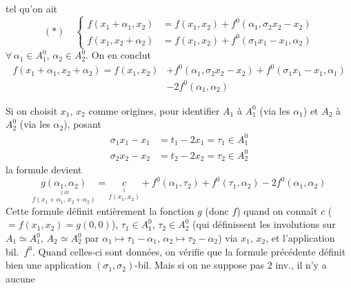 \documentclass[11pt,a4paper]{article}
\begin{document}
tel qu'on ait
\[
  (*) \quad
  \left\{
  \begin{aligned}
    f(x_1 + \alpha_1, x_2) &= f(x_1, x_2) + f^0(\alpha_1, \sigma_2 x_2 - x_2) \\
    f(x_1, x_2 + \alpha_2) &= f(x_1, x_2) + f^0(\sigma_1 x_1 - x_1, \alpha_2)
  \end{aligned}
  \right.
\]
$\forall\, \alpha_1 \in A_1^0$, $\alpha_2 \in A_2^0$. On en conclut
\[
  \begin{aligned}
    f(x_1 + \alpha_1, x_2 + \alpha_2) = f(x_1, x_2) &+ f^0(\alpha_1, \sigma_2 x_2 - x_2) + f^0(\sigma_1 x_1 - x_1, \alpha_1) \\
    &- 2 f^0(\alpha_1, \alpha_2)
  \end{aligned}
\]

Si on choisit $x_1$, $x_2$ comme origines, pour identifier $A_1$ à $A_1^0$ (via les $\alpha_1$) et $A_2$ à $A_2^0$ (via les $\alpha_2$), posant
\[
  \begin{aligned}
    \sigma_1 x_1 - x_1 &= t_1 - 2x_1 = \tau_1 \in A_1^0 \\
    \sigma_2 x_2 - x_2 &= t_2 - 2x_2 = \tau_2 \in A_2^0
  \end{aligned}
\]
la formule devient
\[
  \underset{\overset{\| \mathrm{df}}{f(x_1 + \alpha_1,\, x_2 + \alpha_2)}}{g(\alpha_1, \alpha_2)}
  = \underset{\overset{\|}{f(x_1, x_2)}}{c} + f^0(\alpha_1, \tau_2) + f^0(\tau_1, \alpha_2) - 2 f^0(\alpha_1, \alpha_2)
\]
 Cette formule définit entièrement la fonction $g$ (donc $f$) quand on connaît $c$ ($= f(x_1, x_2) = g(0,0)$), $\tau_1 \in A_1^0$, $\tau_2 \in A_2^0$ (qui définissent les involutions sur $A_1 \simeq A_1^0$, $A_2 \simeq A_2^0$ par $\alpha_1 \mapsto \tau_1 - \alpha_1$, $\alpha_2 \mapsto \tau_2 - \alpha_2$) via $x_1$, $x_2$, et l'application bil.\ $f^0$. Quand celles-ci sont données, on vérifie que la formule précédente définit bien une application $(\sigma_1, \sigma_2)$-bil. Mais si on ne suppose pas $2$ inv., il n'y a aucune

\end{document}
